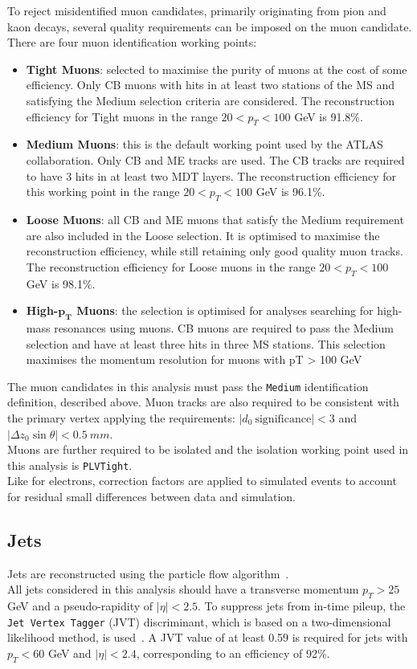 To reject misidentified muon candidates, primarily originating from pion and kaon decays, several 
quality requirements can be imposed on the muon candidate.\\
There are four muon identification working points:
\begin{itemize}
	\item \textbf{Tight Muons}: selected to maximise the purity of muons
at the cost of some efficiency. Only CB muons with hits in at least two stations
of the MS and satisfying the Medium selection criteria are considered.
The reconstruction efficiency for Tight muons in the range $20 < p_T < 100$ GeV is 91.8\%.
	\item \textbf{Medium Muons}: this is the default working point used by the ATLAS collaboration.
Only CB and ME tracks are used. The CB tracks are required to have 3 hits in at
least two MDT layers. The reconstruction efficiency for this working point in
the range $20 < p_T < 100$ GeV is 96.1\%.
	\item \textbf{Loose Muons}: all CB and ME muons that satisfy the Medium requirement are also
included in the Loose selection. It is optimised to maximise the reconstruction efficiency, while 
still retaining only good quality muon tracks. The reconstruction efficiency for
Loose muons in the range $20 < p_T < 100$ GeV is 98.1\%.
	\item \textbf{High-$\bm{p_T}$ Muons}: the selection is optimised for analyses searching for
high-mass resonances using muons. CB muons are required to pass the Medium selection
and have at least three hits in three MS stations. This selection maximises the momentum
resolution for muons with pT > 100 GeV
\end{itemize}
The muon candidates in this analysis must pass the \texttt{Medium}
identification definition, described above. Muon tracks are also required to be consistent with the primary vertex
applying the requirements: 
$|d_0~\mathrm{significance} | < 3$ and 
$|\Delta z_0 \sin\theta| < \SI{0.5}{mm}$. \\
Muons are further required to be isolated and the isolation working point used in this analysis is \texttt{PLVTight}.\\
Like for electrons, correction factors are applied to simulated events
to account for residual small differences between data and simulation. 

\FloatBarrier
\subsection{Jets}
\label{sec:object:jet}
Jets are reconstructed 
using the particle flow algorithm~\cite{PERF-2015-09}. \\
All jets considered in this analysis should have a transverse
momentum $p_{T} > 25$ GeV and a pseudo-rapidity of
$|\eta|\!<\!2.5$.
To suppress jets from in-time pileup, the \texttt{Jet Vertex Tagger} (JVT)
discriminant, which is based on a two-dimensional likelihood
method, is used~\cite{ATLAS-CONF-2014-018}. A JVT value of at least
0.59 is required for jets with $p_{T}< 60$ GeV
and $|\eta|\!<\!2.4$, corresponding to an efficiency of 92\%.

